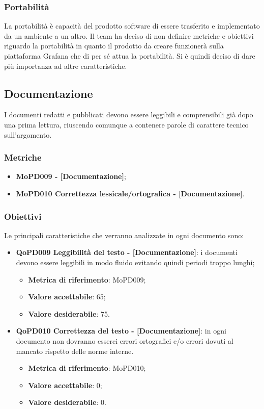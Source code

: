 \documentclass[../piano-di-qualifica.tex]{subfiles}
\begin{document}
\subsubsection{Portabilità}%
\label{sub:portabilita}
La portabilità è capacità del prodotto software di essere trasferito e implementato da un ambiente a un altro.
Il team ha deciso di non definire metriche e obiettivi riguardo la portabilità in quanto il prodotto da creare funzionerà sulla piattaforma Grafana che di per sé attua la portabilità.
Si è quindi deciso di dare più importanza ad altre caratteristiche.

\subsection{Documentazione}%
\label{sub:documentazione}
I documenti redatti e pubblicati devono essere leggibili e comprensibili già dopo una prima lettura, riuscendo comunque a contenere parole di carattere tecnico sull'argomento.

\subsubsection{Metriche}
\label{sub:metriche}
\begin{itemize}
    \item \textbf{MoPD009  - [Documentazione]};
    \item \textbf{MoPD010 Correttezza lessicale/ortografica - [Documentazione]}.
\end{itemize}

\subsubsection{Obiettivi}
\label{sub:obiettivi}
Le principali caratteristiche che verranno analizzate in ogni documento sono:
\begin{itemize}
    \item \textbf{QoPD009 Leggibilità del testo - [Documentazione]}: i documenti devono essere leggibili in modo fluido evitando quindi periodi troppo lunghi;
        \begin{itemize}
            \item \textbf{Metrica di riferimento}: MoPD009;
            \item \textbf{Valore accettabile}: 65;
            \item \textbf{Valore desiderabile}: 75.
        \end{itemize}
    \item \textbf{QoPD010 Correttezza del testo - [Documentazione]}: in ogni documento non dovranno esserci errori ortografici e/o errori dovuti al mancato rispetto delle norme interne.
        \begin{itemize}
            \item \textbf{Metrica di riferimento}: MoPD010;
            \item \textbf{Valore accettabile}: 0;
            \item \textbf{Valore desiderabile}: 0.
        \end{itemize}
\end{itemize}
\end{document}
